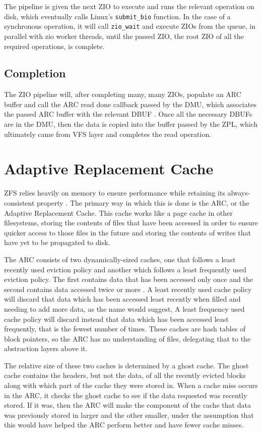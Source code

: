 The pipeline is given the next ZIO to execute and runs the relevant operation on disk, 
which eventually calls Linux's \texttt{submit\_bio} function.
In the case of a synchronous operation, it will call \texttt{zio\_wait} and execute ZIOs from the queue, in parallel with zio worker threads,
until the passed ZIO, the root ZIO of all the required operations, is complete.

\subsection{Completion}
The ZIO pipeline will, after completing many, many ZIOs, populate an ARC buffer and call the ARC read done callback passed by the DMU, 
which associates the passed ARC buffer with the relevant DBUF \cite{ahrens_read_write,zfs}.
Once all the necessary DBUFs are in the DMU, then the data is copied into the buffer passed by the ZPL, which ultimately came from VFS layer and completes the read operation.

\section{Adaptive Replacement Cache}
\label{chapter:ARC}
ZFS relies heavily on memory to ensure performance while retaining its always-consistent property \cite{ahrens_read_write}.
The primary way in which this is done is the ARC, or the Adaptive Replacement Cache. 
This cache works like a page cache in other filesystems, storing the contents of files that have been accessed
in order to ensure quicker access to those files in the future and storing the contents of writes that have yet to be
propagated to disk.

The ARC consists of two dynamically-sized caches, one that follows a least recently used eviction policy 
and another which follows a least frequently used eviction policy.
The first contains data that has been accessed only once and the second contains data accessed twice or more \cite{megiddo_dharmendra_ARC}.
A least recently used cache policy will discard that data which has been accessed least recently
when filled and needing to add more data, as the name would suggest, 
A least frequency used cache policy will discard instead that data which has been accessed least frequently, 
that is the fewest number of times.
These caches are hash tables of block pointers, so the ARC has no understanding of files, 
delegating that to the abstraction layers above it.

The relative size of these two caches is determined by a ghost cache. 
The ghost cache contains the headers, but not the data, of all the recently evicted blocks
along with which part of the cache they were stored in.
When a cache miss occurs in the ARC, it checks the ghost cache to see if the data requested was recently stored.
If it was, then the ARC will make the component of the cache that data was previously stored in larger and the other smaller,
under the assumption that this would have helped the ARC perform better and have fewer cache misses.

